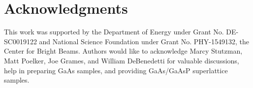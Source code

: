 \section{Acknowledgments}
This work was supported by the Department of Energy under Grant No. DE-SC0019122 and National Science Foundation under Grant No. PHY-1549132, the Center for Bright Beams.
Authors would like to acknowledge Marcy Stutzman, Matt Poelker, Joe Grames, and William DeBenedetti for valuable discussions, help in preparing GaAs samples, and providing GaAs/GaAsP superlattice samples.

